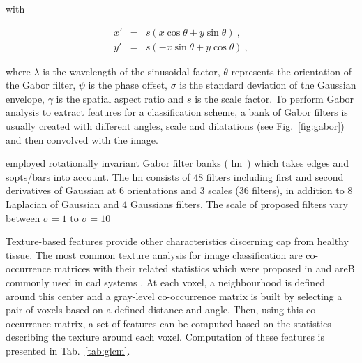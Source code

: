 \noindent with 

\begin{eqnarray}
	x' & = & s\left( x \cos \theta + y \sin \theta \right) \ , \nonumber \\
	y' & = & s \left( - x \sin \theta + y \cos \theta \right) \ , \nonumber
\end{eqnarray}

\noindent where $\lambda$ is the wavelength of the sinusoidal factor, $\theta$ represents the orientation of the Gabor filter, $\psi$ is the phase offset, $\sigma$ is the standard deviation of the Gaussian envelope, $\gamma$ is the spatial aspect ratio and $s$ is the scale factor.
To perform Gabor analysis to extract features for a classification scheme, a bank of Gabor filters is usually created with different angles, scale and dilatations (see Fig.~\ref{fig:gabor}) and then convolved with the image. 

\citeauthor{rampun2016computer} employed rotationally invariant Gabor filter banks ( \ac{lm}~\cite{varma2005statistical}) which takes edges and sopts/bars into account. 
The \ac{lm} consists of 48 filters including first and second derivatives of Gaussian at 6 orientations and 3 scales (36 filters), in addition to 8 Laplacian of Gaussian and 4 Gaussians filters.
The scale of proposed filters vary between $\sigma = 1$ to $\sigma = 10$ \si{\px}


Texture-based features provide other characteristics discerning \ac{cap} from healthy tissue.
The most common texture analysis for image classification are co-occurrence matrices with their related statistics which were proposed in \cite{Haralick1973} and areB commonly used in \ac{cad} systems \cite{Antic2013,Niaf2011,Niaf2012,Tiwari2009a,Tiwari2010,Tiwari2013,Viswanath2008,Viswanath2008a,Viswanath2011,Viswanath2012}.
At each voxel, a neighbourhood is defined around this center and a gray-level co-occurrence matrix is built by selecting a pair of voxels based on a defined distance and angle.
Then, using this co-occurrence matrix, a set of features can be computed based on the statistics describing the texture around each voxel.
Computation of these features is presented in Tab.~\ref{tab:glcm}.

